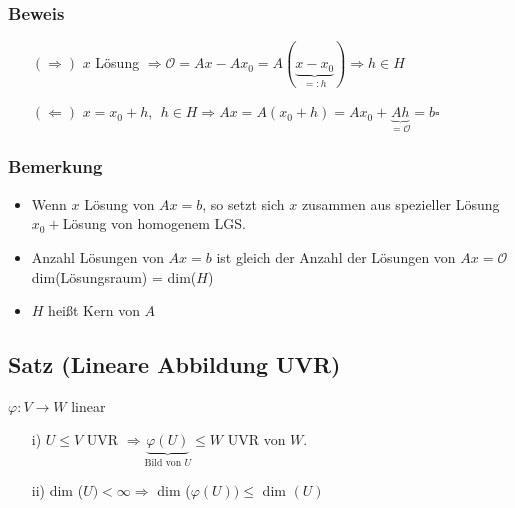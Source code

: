 \documentclass[a4paper, 12pt,titlepage, pdf, headsepline]{scrartcl}
\newcommand{\qed}{\hfill$\square$}
\renewcommand{\>}{\rightarrow}
\renewcommand{\*}{\cdot}
\renewcommand{\O}{\mathcal{O}}
\renewcommand{\phi}{\varphi}
\begin{document}
		      			\subsubsection*{Beweis}
		      			\begin{itemize}
		      				\item[$(\Rightarrow)$] $x$ Lösung $\Rightarrow\O = Ax -Ax_0 = A(\underbrace{x-x_0}_{=:h}) \Rightarrow h \in H$
		      				\item[$(\Leftarrow)$] $x= x_0 + h,~~h \in H \Rightarrow Ax = A(x_0 + h) = Ax_0 + \underbrace{Ah}_{=\O} = b$\qed
		      			\end{itemize}
		      			\subsubsection*{Bemerkung}
		      			\begin{itemize}
		      				\item Wenn $x$ Lösung von $Ax = b$, so setzt sich $x$ zusammen aus spezieller Lösung $x_0 + $Lösung von homogenem LGS.
		      				\item Anzahl Lösungen von $Ax = b$ ist gleich der Anzahl der Lösungen von $Ax = \O$\\
		      				      dim(Lösungsraum) = dim($H$)
		      				\item $H$ heißt Kern von $A$
		      			\end{itemize}
		      			\subsection{Satz (Lineare Abbildung UVR)}
		      			\label{6.7}
		      			$\phi: V \rightarrow W$ linear
		      			\begin{itemize}
		      				\item[i)] $U \leq V$ UVR $\Rightarrow \underbrace{\phi(U)}_{\text{Bild von }U} \leq W $ UVR von $W$.
		      				\item[ii)]
		      				      dim ($U) < \infty \Rightarrow$ dim ($\phi(U)) \leq$ dim $(U)$
		      			\end{itemize}
\end{document}
